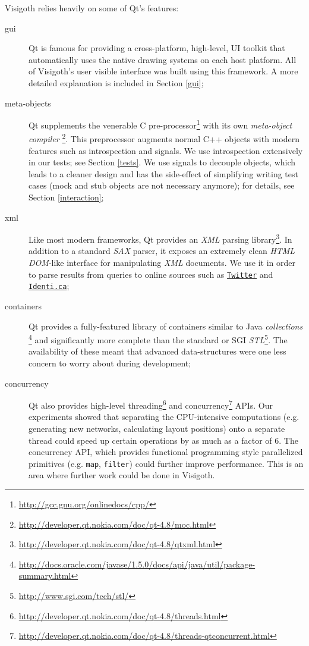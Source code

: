 \documentclass[a4paper,11pt,titlepage]{article}
\let\stdhref\href
\renewcommand{\href}[2]{\stdhref{#1}{\texttt{#2}}}
\newcommand{\code}[1]{\texttt{#1}}
\newcommand{\buzz}[1]{\emph{#1}}
\begin{document}
Visigoth relies heavily on some of Qt's features:
\begin{description}
\item [gui] Qt is famous for providing a cross-platform, high-level,
  UI toolkit that automatically uses the native drawing systems on
  each host platform. All of Visigoth's user visible interface was
  built using this framework. A more detailed explanation is included
  in Section \ref{gui};
\item [meta-objects] Qt supplements the venerable C
  pre-processor\footnote{\url{http://gcc.gnu.org/onlinedocs/cpp/}}
  with its own \buzz{meta-object
    compiler} \footnote{\url{http://developer.qt.nokia.com/doc/qt-4.8/moc.html}}.
  This preprocessor augments normal C++ objects with modern features
  such as introspection and signals. We use introspection extensively
  in our tests; see Section \ref{tests}. We use signals to decouple
  objects, which leads to a cleaner design and has the side-effect of
  simplifying writing test cases (mock and stub objects are not
  necessary anymore); for details, see Section \ref{interaction};
\item [xml] Like most modern frameworks, Qt provides an \buzz{XML}
  parsing
  library\footnote{\url{http://developer.qt.nokia.com/doc/qt-4.8/qtxml.html}}.
  In addition to a standard \buzz{SAX} parser, it exposes an extremely
  clean \buzz{HTML DOM}-like interface for manipulating \buzz{XML}
  documents. We use it in order to parse results from queries to
  online sources such as \href{http://twitter.com}{Twitter} and
  \href{http://identi.ca}{Identi.ca};
\item [containers] Qt provides a fully-featured library of containers
  similar to Java
  \buzz{collections} \footnote{\url{http://docs.oracle.com/javase/1.5.0/docs/api/java/util/package-summary.html}}
  and significantly more complete than the standard or SGI
  \buzz{STL}\footnote{\url{http://www.sgi.com/tech/stl/}}. The
  availability of these meant that advanced data-structures were one
  less concern to worry about during development;
\item [concurrency] Qt also provides high-level
  threading\footnote{\url{http://developer.qt.nokia.com/doc/qt-4.8/threads.html}}
  and
  concurrency\footnote{\url{http://developer.qt.nokia.com/doc/qt-4.8/threads-qtconcurrent.html}}
  APIs. Our experiments showed that separating the CPU-intensive
  computations (e.g. generating new networks, calculating layout
  positions) onto a separate thread could speed up certain operations
  by as much as a factor of $6$. The concurrency API, which provides
  functional programming style parallelized primitives
  (e.g. \code{map}, \code{filter}) could further improve performance.
  This is an area where further work could be done in Visigoth.
\end{description}
\end{document}

